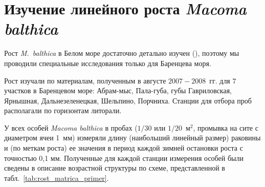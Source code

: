\afterpage{\clearpage}

	\section{Изучение линейного роста {\it Macoma balthica}}
Рост \textit{M.~balthica} в Белом море достаточно детально изучен (\cite{Semenova_1970, Maximovich_et_al_1992, Hummel_et_al_1998}), поэтому мы проводили специальные исследования только для Баренцева моря.

Рост изучали по материалам, полученным в августе $2007 - 2008$~гг. для $7$ участков в Баренцевом море: Абрам-мыс, Пала-губа, губы Гавриловская, Ярнышная, Дальнезеленецкая, Шельпино, Порчниха.
Станции для отбора проб располагали по горизонтам литорали. 

У всех особей {\it Macoma balthica} в пробах ($1/30$ или $1/20$~м$^2$, промывка на сите с диаметром ячеи 1~мм) измеряли длину (наибольший линейный размер) раковины и (по меткам роста) ее значения в период каждой зимней остановки роста с точностью 0,1 мм.
Полученные для каждой станции измерения особей были сведены в описание возрастной структуры по схеме, представленной в табл.~\ref{tab:rost_matrica_primer}. 
